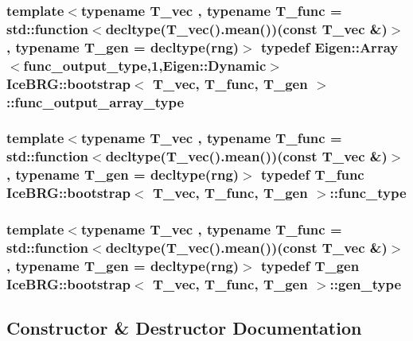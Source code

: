 \subsubsection[{func\+\_\+output\+\_\+array\+\_\+type}]{\setlength{\rightskip}{0pt plus 5cm}template$<$typename T\+\_\+vec , typename T\+\_\+func  = std\+::function$<$decltype(\+T\+\_\+vec().\+mean())(const T\+\_\+vec \&)$>$, typename T\+\_\+gen  = decltype(rng)$>$ typedef Eigen\+::\+Array$<${\bf func\+\_\+output\+\_\+type},1,Eigen\+::\+Dynamic$>$ {\bf Ice\+B\+R\+G\+::bootstrap}$<$ T\+\_\+vec, T\+\_\+func, T\+\_\+gen $>$\+::{\bf func\+\_\+output\+\_\+array\+\_\+type}}\label{classIceBRG_1_1bootstrap_ac0d254f146b5ea54905304d2e54d9cac}
\hypertarget{classIceBRG_1_1bootstrap_a4031940b86921fbeb3db1d05a823c7e7}{}
\subsubsection[{func\+\_\+type}]{\setlength{\rightskip}{0pt plus 5cm}template$<$typename T\+\_\+vec , typename T\+\_\+func  = std\+::function$<$decltype(\+T\+\_\+vec().\+mean())(const T\+\_\+vec \&)$>$, typename T\+\_\+gen  = decltype(rng)$>$ typedef T\+\_\+func {\bf Ice\+B\+R\+G\+::bootstrap}$<$ T\+\_\+vec, T\+\_\+func, T\+\_\+gen $>$\+::{\bf func\+\_\+type}}\label{classIceBRG_1_1bootstrap_a4031940b86921fbeb3db1d05a823c7e7}
\hypertarget{classIceBRG_1_1bootstrap_a020ba191b3581f1896c0f4b968f7c5b6}{}
\subsubsection[{gen\+\_\+type}]{\setlength{\rightskip}{0pt plus 5cm}template$<$typename T\+\_\+vec , typename T\+\_\+func  = std\+::function$<$decltype(\+T\+\_\+vec().\+mean())(const T\+\_\+vec \&)$>$, typename T\+\_\+gen  = decltype(rng)$>$ typedef T\+\_\+gen {\bf Ice\+B\+R\+G\+::bootstrap}$<$ T\+\_\+vec, T\+\_\+func, T\+\_\+gen $>$\+::{\bf gen\+\_\+type}}\label{classIceBRG_1_1bootstrap_a020ba191b3581f1896c0f4b968f7c5b6}


\subsection{Constructor \& Destructor Documentation}
\hypertarget{classIceBRG_1_1bootstrap_a4e5d75942f9e2387a4a767314ce684b4}{}
